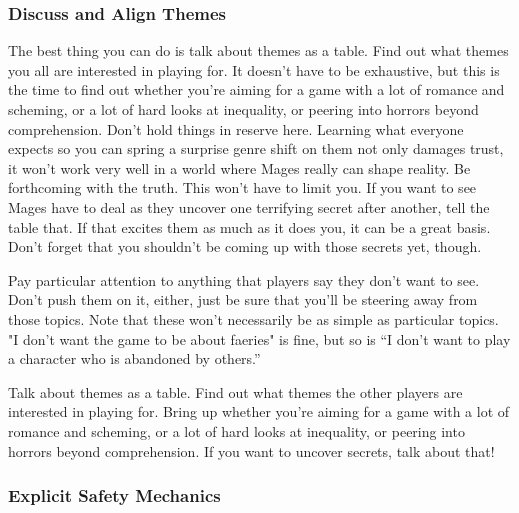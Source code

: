 \documentclass[
  oneside,
  statementpaper,
  9pt]{memoir}
\begin{document}
\hypertarget{discuss-and-align-themes}{%
\subsubsection{Discuss and Align
Themes}\label{discuss-and-align-themes}}

\begin{MC}

The best thing you can do is talk about themes as a table. Find out what themes you all are interested in playing for. It doesn’t have to be exhaustive, but this is the time to find out whether you’re aiming for a game with a lot of romance and scheming, or a lot of hard looks at inequality, or peering into horrors beyond comprehension. Don’t hold things in reserve here. Learning what everyone expects so you can spring a surprise genre shift on them not only damages trust, it won’t work very well in a world where Mages really can shape reality. Be forthcoming with the truth. This won’t have to limit you. If you want to see Mages have to deal as they uncover one terrifying secret after another, tell the table that. If that excites them as much as it does you, it can be a great basis. Don’t forget that you shouldn’t be coming up with those secrets yet, though.

Pay particular attention to anything that players say they don’t want to see. Don’t push them on it, either, just be sure that you’ll be steering away from those topics. Note that these won’t necessarily be as simple as particular topics. "I don’t want the game to be about faeries" is fine, but so is “I don’t want to play a character who is abandoned by others.”

\end{MC}

\begin{Player}

Talk about themes as a table. Find out what themes the other players are interested in playing for. Bring up whether you're aiming for a game with a lot of romance and scheming, or a lot of hard looks at inequality, or peering into horrors beyond comprehension. If you want to uncover secrets, talk about that!

\end{Player}

\hypertarget{explicit-safety-mechanics}{%
\subsubsection{Explicit Safety
Mechanics}\label{explicit-safety-mechanics}}
\end{document}
